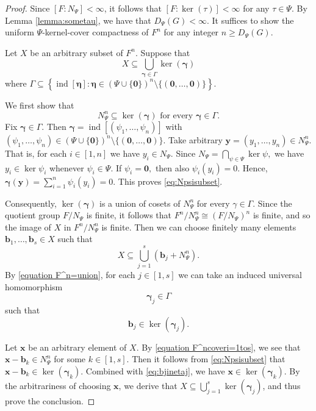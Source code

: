 \documentclass[a4paper, 12pt]{article}
\begin{document}
\begin{proof} Since $[F:N_{\Psi}]<\infty$, it follows that $[F:\ker(\tau)]<\infty$ for any $\tau\in \Psi$. By Lemma \ref{lemma:sometau}, we have that $D_{\Psi}(G)<\infty$. It suffices to show the uniform $\Psi$-kernel-cover compactness of $F^n$ for any integer $n\geq D_{\Psi}(G)$.

Let $X$ be an arbitrary subset of $F^n$. Suppose that
\begin{equation}\label{equation F^n=union}
X\subseteq \bigcup_{\boldsymbol{\gamma}\in\Gamma}\ker(\boldsymbol{\gamma})
\end{equation}
where
$\Gamma\subseteq
\left\{
\operatorname{ind}[\boldsymbol{\eta}]:
\boldsymbol{\eta}\in
(\Psi\cup\{\mathbf 0\})^n
\setminus\{(\mathbf 0,\ldots,\mathbf 0)\}
\right\}.$


We first show that
\begin{equation}\label{eq:Npsisubset}
N_{\Psi}^n\subseteq \ker(\boldsymbol{\gamma})
\mbox{ for every } \boldsymbol{\gamma}\in\Gamma.
\end{equation}
Fix $\boldsymbol{\gamma}\in\Gamma$. Then $\boldsymbol{\gamma}=\operatorname{ind}[(\psi_1,\ldots,\psi_n)]$ with $(\psi_1,\ldots,\psi_n)\in
(\Psi\cup\{\mathbf 0\})^n
\setminus\{(\mathbf 0,\ldots,\mathbf 0)\}.$
Take arbitrary
$\boldsymbol y=(y_1,\ldots,y_n)\in N_{\Psi}^n.$
That is, for each $i\in [1,n]$ we have $y_i\in N_{\Psi}$. Since
$N_{\Psi}=\bigcap_{\psi\in\Psi}\ker\psi,$
we have $y_i\in\ker\psi_i$ whenever $\psi_i\in\Psi$. If
$\psi_i=\mathbf 0,$ then also $\psi_i(y_i)=0$. Hence,
$\boldsymbol{\gamma}(\boldsymbol y)=\sum_{i=1}^n\psi_i(y_i)=0.$
This proves \eqref{eq:Npsisubset}.

Consequently, $\ker(\boldsymbol{\gamma})$ is a union of cosets of $N_{\Psi}^n$ for every $\gamma\in\Gamma$.
Since the quotient group $F/N_{\Psi}$ is finite, it follows that $F^n/N_{\Psi}^n\cong (F/N_{\Psi})^n$ is finite, and so the image of $X$ in $F^n/N_\Psi^n$ is finite.   Then we can choose finitely many elements
$\boldsymbol{b}_1,\ldots,\boldsymbol{b}_s\in X$ such that
\begin{equation}\label{equation F^ncoveri=1tos}
X\subseteq \bigcup\limits_{j=1}^s (\boldsymbol{b}_j+N_{\Psi}^n).
\end{equation}
 By \eqref{equation F^n=union}, for each $j\in [1,s]$ we can take an induced universal homomorphism $$\boldsymbol{\gamma}_j\in\Gamma$$ such that
 \begin{equation}\label{eq:bjinetaj}
 \boldsymbol{b}_j\in\ker(\boldsymbol{\gamma}_j).
 \end{equation}

Let $\boldsymbol x$ be an arbitrary element of $X$. By \eqref{equation F^ncoveri=1tos}, we see that $\boldsymbol x-\boldsymbol{b}_k\in N_{\Psi}^n$ for some $k\in [1,s]$. Then it follows from \eqref{eq:Npsisubset} that $\boldsymbol x-\boldsymbol{b}_k\in \ker(\boldsymbol{\gamma}_k)$. Combined with \eqref{eq:bjinetaj}, we have $\boldsymbol x\in \ker(\boldsymbol{\gamma}_k)$. By the arbitrariness of choosing $\boldsymbol x$, we derive that $X\subseteq \bigcup_{j=1}^s\ker(\boldsymbol{\gamma}_j)$, and thus prove the conclusion.
\end{proof}
\end{document}
